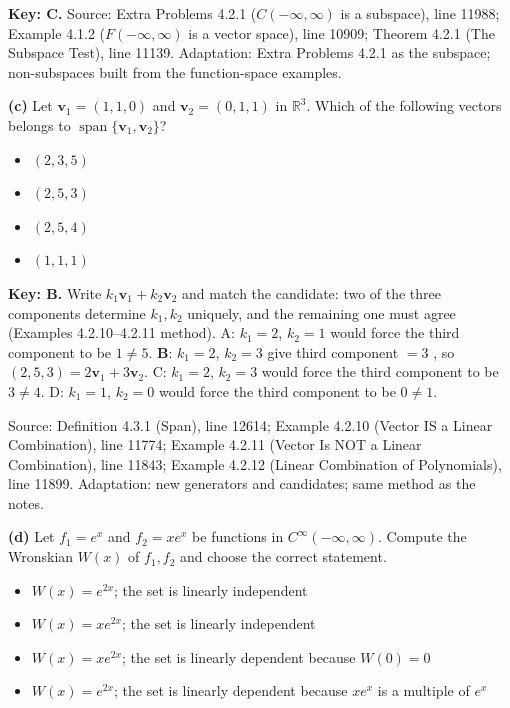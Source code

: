 \documentclass[11pt,a4paper]{article}
\newcommand{\Src}[1]{{\footnotesize\color{black!65}Source: #1}}
\begin{document}
\textbf{Key: C.} \Src{Extra Problems 4.2.1 ($C(-\infty,\infty)$ is a subspace), line 11988; Example 4.1.2 ($F(-\infty,\infty)$ is a vector space), line 10909; Theorem 4.2.1 (The Subspace Test), line 11139. Adaptation: Extra Problems 4.2.1 as the subspace; non-subspaces built from the function-space examples.}\par
\textbf{(c)} Let $\mathbf{v}_1=(1,1,0)$ and $\mathbf{v}_2=(0,1,1)$ in $\mathbb{R}^3$. Which of the following vectors belongs to $\operatorname{span}\{\mathbf{v}_1,\mathbf{v}_2\}$?\par
\begin{itemize}[leftmargin=8mm,itemsep=0pt]\item[A] $(2,3,5)$\item[B$^{\ast}$] $(2,5,3)$\item[C] $(2,5,4)$\item[D] $(1,1,1)$\end{itemize}
\textbf{Key: B.} Write $k_1\mathbf{v}_1+k_2\mathbf{v}_2$ and match the candidate: two of the three components determine $k_1,k_2$ uniquely, and the remaining one must agree (Examples 4.2.10--4.2.11 method). A: $k_1=2$, $k_2=1$ would force the third component to be $1\neq5$. \textbf{B}: $k_1=2$, $k_2=3$ give third component $=3$ \checkmark, so $(2,5,3)=2\mathbf{v}_1+3\mathbf{v}_2$. C: $k_1=2$, $k_2=3$ would force the third component to be $3\neq4$. D: $k_1=1$, $k_2=0$ would force the third component to be $0\neq1$.\par
\Src{Definition 4.3.1 (Span), line 12614; Example 4.2.10 (Vector IS a Linear Combination), line 11774; Example 4.2.11 (Vector Is NOT a Linear Combination), line 11843; Example 4.2.12 (Linear Combination of Polynomials), line 11899. Adaptation: new generators and candidates; same method as the notes.}\par
\textbf{(d)} Let $f_1=e^{x}$ and $f_2=xe^{x}$ be functions in $C^{\infty}(-\infty,\infty)$. Compute the Wronskian $W(x)$ of $f_1,f_2$ and choose the correct statement.\par
\begin{itemize}[leftmargin=8mm,itemsep=0pt]\item[A$^{\ast}$] $W(x)=e^{2x}$; the set is linearly independent\item[B] $W(x)=xe^{2x}$; the set is linearly independent\item[C] $W(x)=xe^{2x}$; the set is linearly dependent because $W(0)=0$\item[D] $W(x)=e^{2x}$; the set is linearly dependent because $xe^{x}$ is a multiple of $e^{x}$\end{itemize}
\end{document}
